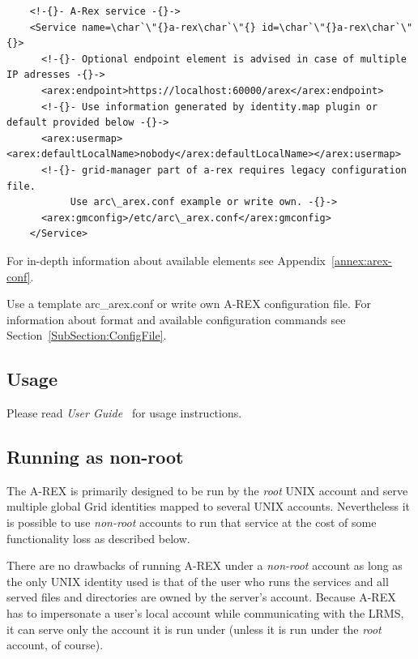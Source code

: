 \documentclass{article}                            %
\begin{document}
\begin{shaded}
\begin{verbatim}
    <!-{}- A-Rex service -{}->
    <Service name=\char`\"{}a-rex\char`\"{} id=\char`\"{}a-rex\char`\"{}>
      <!-{}- Optional endpoint element is advised in case of multiple IP adresses -{}->
      <arex:endpoint>https://localhost:60000/arex</arex:endpoint>
      <!-{}- Use information generated by identity.map plugin or default provided below -{}->
      <arex:usermap><arex:defaultLocalName>nobody</arex:defaultLocalName></arex:usermap>
      <!-{}- grid-manager part of a-rex requires legacy configuration file.
           Use arc\_arex.conf example or write own. -{}->
      <arex:gmconfig>/etc/arc\_arex.conf</arex:gmconfig>
    </Service>
\end{verbatim}
\end{shaded}

For in-depth information about available elements see Appendix~\ref{annex:arex-conf}. 

Use a template arc\_arex.conf or write own A-REX configuration file.
For information about format and available configuration commands
see Section~\ref{SubSection:ConfigFile}.


\subsection{Usage}

Please read \emph{User Guide}~\cite{userguide1} for usage instructions.

\subsection{Running as non-root}

The A-REX is primarily designed to be run by the \emph{root} UNIX
account and serve multiple global Grid identities mapped to several
UNIX accounts. Nevertheless it is possible to use \emph{non-root}
accounts to run that service at the cost of some functionality loss
as described below.

There are no drawbacks of running A-REX under a \emph{non-root} account
as long as the only UNIX identity used is that of the user who runs
the services and all served files and directories are owned by the
server's account. Because A-REX has to impersonate a user's local
account while communicating with the LRMS, it can serve only the account
it is run under (unless it is run under the \emph{root} account, of
course).
\end{document}
